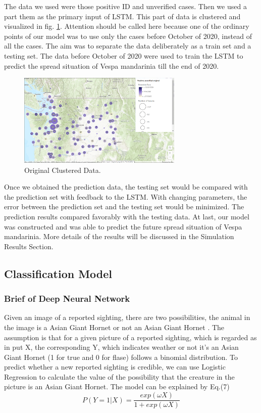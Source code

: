 \documentclass{mcmthesis}
\begin{document}
The data we used were those positive ID and unverified cases. Then we used a part them as the primary input of LSTM. This part of data is clustered and visualized in fig. \ref{fig:Ori}. Attention should be called here because one of the ordinary points of our model was to use only the cases before October of 2020, instead of all the cases. The aim was to separate the data  deliberately as a train set and a testing set. The data before October of 2020 were used to train the LSTM to predict the spread situation of Vespa mandarinia till the end of 2020. 

\begin{figure}[!htbp]
	\centering
 	\includegraphics[width = 0.7\textwidth]{Original_Clustered.png} 
	\caption{Original Clustered Data.}
	\label{fig:Ori}
\end{figure}


Once we obtained the prediction data, the testing set would be compared with the prediction set with feedback to the LSTM. With changing parameters, the error between the prediction set and the testing set would be minimized. The prediction results compared favorably with the testing data. At last, our model was constructed and was able to predict the future spread situation of Vespa mandarinia. More details of the results will be discussed in the Simulation Results Section.


\subsection{Classification Model}

\subsubsection{Brief of Deep Neural Network}
Given an image of a reported sighting, there are two possibilities, the animal in the image is a Asian Giant Hornet or not an Asian Giant Hornet . The assumption is that for a given picture of a reported sighting, which is regarded as in put X, the corresponding Y, which indicates weather or not it's an Asian Giant Hornet (1 for true and 0 for flase) follows a binomial distribution. To predict whether a new reported sighting is credible, we can use Logistic Regression to calculate the value of the possibility that the creature in the picture is an Asian Giant Hornet. The model can be explained by Eq.(7)
\begin{equation}
    P(Y=1|X) = \frac{exp(\omega X)}{1 + exp(\omega X)} 
\end{equation} \label{logistic}
\end{document}
